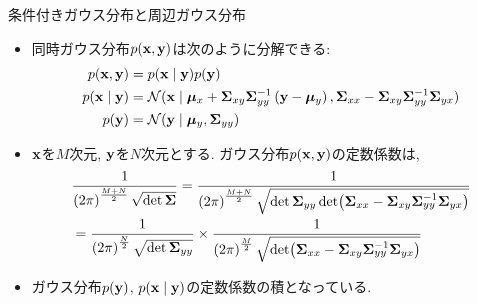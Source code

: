 \documentclass[dvipdfmx,notheorems,t]{beamer}
\begin{document}
\begin{frame}{条件付きガウス分布と周辺ガウス分布}
\begin{itemize}
  \item 同時ガウス分布$p(\vb{x}, \vb{y})$は次のように分解できる:
  \begin{align*}
    p(\vb{x}, \vb{y}) &= p(\vb{x} \mid \vb{y}) p(\vb{y}) \\
    p(\vb{x} \mid \vb{y}) &= \mathcal{N}(\vb{x} \mid \vb*{\mu}_x
      + \vb{\Sigma}_{xy} \vb{\Sigma}_{yy}^{-1} \left( \vb{y} - \vb*{\mu}_y \right),
      \vb{\Sigma}_{xx} - \vb{\Sigma}_{xy} \vb{\Sigma}_{yy}^{-1} \vb{\Sigma}_{yx}) \\
    p(\vb{y}) &= \mathcal{N}(\vb{y} \mid \vb*{\mu}_y, \vb{\Sigma}_{yy})
  \end{align*}
  \item $\vb{x}$を$M$次元, $\vb{y}$を$N$次元とする. ガウス分布$p(\vb{x}, \vb{y})$の定数係数は,
  \begin{align*}
    & \frac{1}{\left( 2\pi \right)^\frac{M + N}{2} \sqrt{\det \vb{\Sigma}}}
    = \frac{1}{\left( 2\pi \right)^\frac{M + N}{2}
      \sqrt{\det \vb{\Sigma}_{yy} \det(\vb{\Sigma}_{xx} - \vb{\Sigma}_{xy} \vb{\Sigma}_{yy}^{-1} \vb{\Sigma}_{yx})}} \\
    &= \frac{1}{\left( 2\pi \right)^\frac{N}{2} \sqrt{\det \vb{\Sigma}_{yy}}}
      \times \frac{1}{\left( 2\pi \right)^\frac{M}{2} \sqrt{
      \det(\vb{\Sigma}_{xx} - \vb{\Sigma}_{xy} \vb{\Sigma}_{yy}^{-1} \vb{\Sigma}_{yx})}}
  \end{align*}
  \item ガウス分布$p(\vb{y})$, $p(\vb{x} \mid \vb{y})$の定数係数の積となっている.
\end{itemize}
\end{frame}
\end{document}
